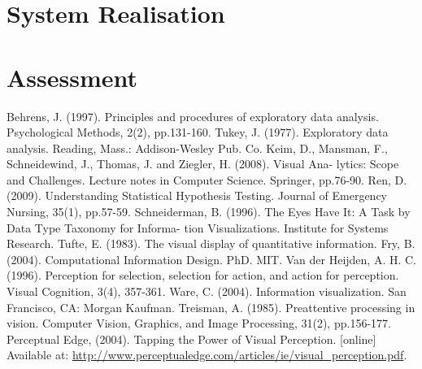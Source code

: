 \documentclass[16pt]{extreport}
\begin{document}
\section{System Realisation}
\section{Assessment}

 \begin{thebibliography}{99}
Behrens, J. (1997). Principles and procedures of exploratory data analysis. Psychological Methods, 2(2), pp.131-160.
Tukey, J. (1977). Exploratory data analysis. Reading, Mass.: Addison-Wesley Pub. Co.
Keim, D., Mansman, F., Schneidewind, J., Thomas, J. and Ziegler, H. (2008). Visual Ana- lytics: Scope and Challenges. Lecture notes in Computer Science. Springer, pp.76-90.
Ren, D. (2009). Understanding Statistical Hypothesis Testing. Journal of Emergency Nursing, 35(1), pp.57-59.
Schneiderman, B. (1996). The Eyes Have It: A Task by Data Type Taxonomy for Informa- tion Visualizations. Institute for Systems Research.
Tufte, E. (1983). The visual display of quantitative information.
Fry, B. (2004). Computational Information Design. PhD. MIT.
Van der Heijden, A. H. C. (1996). Perception for selection, selection for action, and action for perception. Visual Cognition, 3(4), 357-361.
Ware, C. (2004). Information visualization. San Francisco, CA: Morgan Kaufman.
Treisman, A. (1985). Preattentive processing in vision. Computer Vision, Graphics, and Image Processing, 31(2), pp.156-177.
Perceptual Edge, (2004). Tapping the Power of Visual Perception. [online] Available at: \url{http://www.perceptualedge.com/articles/ie/visual_perception.pdf}.
\end{thebibliography}
\end{document}
